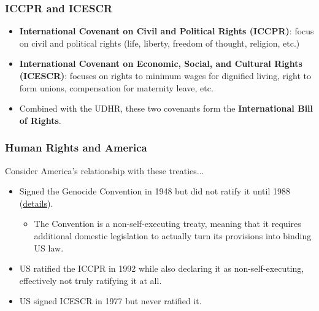 \documentclass[handout]{beamer}
\begin{document}
\begin{frame} 
	\frametitle{\LARGE{ICCPR and ICESCR}}
	\begin{itemize}
		\item \textbf{International Covenant on Civil and Political Rights (ICCPR)}: focus on civil and political rights (life, liberty, freedom of thought, religion, etc.) \pause
		\item \textbf{International Covenant on Economic, Social, and Cultural Rights (ICESCR)}: focuses on rights to minimum wages for dignified living, right to form unions, compensation for maternity leave, etc.	
		\item Combined with the UDHR, these two covenants form the \textbf{International Bill of Rights}.
	\end{itemize}
\end{frame}

\begin{frame} 
	\frametitle{\LARGE{Human Rights and America}}
	Consider America's relationship with these treaties...
	\begin{itemize}
		\item Signed the Genocide Convention in 1948 but did not ratify it until 1988 (\href{https://enoughproject.org/blog/day-us-ratifies-genocide-convention}{details}).
		\begin{itemize}
			\item The Convention is a non-self-executing treaty, meaning that it requires additional domestic legislation to actually turn its provisions into binding US law. \pause
		\end{itemize}
		\item US ratified the ICCPR in 1992 while also declaring it as non-self-executing, effectively not truly ratifying it at all.\pause
		\item US signed ICESCR in 1977 but never ratified it. 
	\end{itemize}
	
\end{frame}
\end{document}

